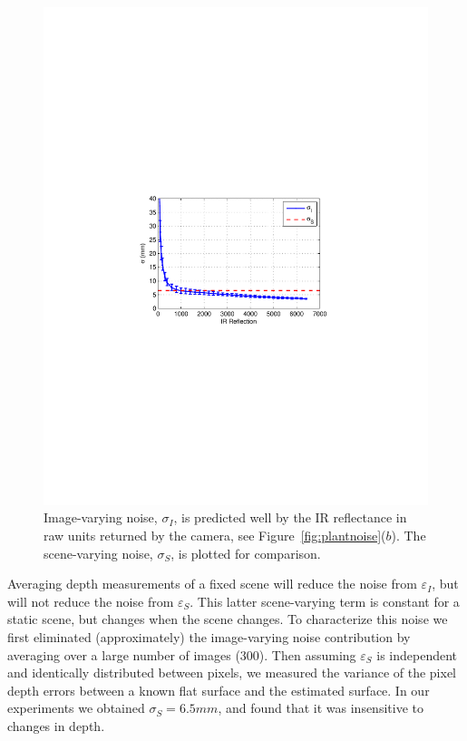 \begin{figure}
\begin{center}
   \includegraphics[trim=120 280 110 290,clip,width=0.9\linewidth]{Figures/SigmaInterframe}
\end{center}
   \caption{Image-varying noise, $\sigma_I$, is predicted well by the IR reflectance in raw units returned by the camera, see Figure~\ref{fig:plantnoise}($b$).  The scene-varying noise, $\sigma_S$, is plotted for comparison.}
\label{fig:sigmainterframe}
\end{figure}

Averaging depth measurements of a fixed scene will reduce the noise from $\varepsilon_I$, but will not reduce the noise from $\varepsilon_S$.  This latter scene-varying term is constant for a static scene, but changes when the scene changes.  To characterize this noise we first eliminated (approximately) the image-varying noise contribution by averaging over a large number of images (300).  Then assuming $\varepsilon_S$ is independent and identically distributed between pixels, we measured the variance of the pixel depth errors between a known flat surface and the estimated surface.  In our experiments we obtained $\sigma_S=6.5mm$, and found that it was insensitive to changes in depth.

